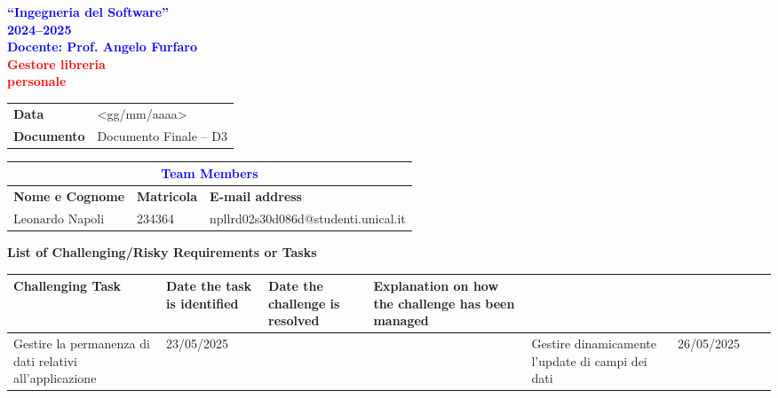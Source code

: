 


\begin{titlepage}
  \begin{center}
    \thispagestyle{title}
    \vspace*{1.5cm}

    \begin{center}
      {\LARGE \textbf{\textcolor{blue}{``Ingegneria del Software''}}}\\[0.3cm]
      {\LARGE \textbf{\textcolor{blue}{2024--2025}}}\\[1cm]
      {\normalsize \textbf{\textcolor{blue}{Docente: Prof. Angelo Furfaro}}}\\[1.2cm]
      {\Huge \textbf{\textcolor{red}{Gestore libreria}}}\\[0.3cm]
      {\Huge \textbf{\textcolor{red}{personale}}}
    \end{center}

    \vspace*{2.5cm}

    \noindent
    \begin{tabular}{|>{\bfseries}p{3cm}|p{12cm}|}
      \hline
      Data & <gg/mm/aaaa> \\
      Documento & Documento Finale -- D3 \\
      \hline
    \end{tabular}

    \vspace*{2.5cm}

    \begin{tabular}{|l|l|l|}
      \hline
      \multicolumn{3}{|c|}{\large \textbf{\textcolor{blue}{Team Members}}} \\
      \hline
      \textbf{Nome e Cognome} & \textbf{Matricola} & \textbf{E-mail address} \\
      \hline
      Leonardo Napoli & 234364 & npllrd02s30d086d@studenti.unical.it \\
      \hline
    \end{tabular}
  \end{center}
\end{titlepage}

\tableofcontents
\newpage
\pagestyle{plain}
{\Large \textbf{List of Challenging/Risky Requirements or Tasks}\label{list-of-challengingrisky-requirements-or-tasks}}

\begin{center}
  \begin{tabularx}{\textwidth}{|X|X|X|X|}
    \hline
    \textbf{Challenging Task}&
    \textbf{Date the task is identified}&
    \textbf{Date the challenge is resolved}&
    \textbf{Explanation on how the challenge has been managed}\\
    \hline
    Gestire la permanenza di dati relativi all'applicazione &
    23/05/2025 &
    &
    &
    \hline
    Gestire dinamicamente l'update di campi dei dati &
    26/05/2025&
    &
    &
  \end{tabularx}
\end{center}

